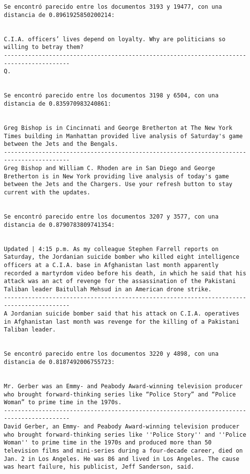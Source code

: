 \documentclass[11pt]{article}
\begin{document}
\begin{Verbatim}[commandchars=\\\{\}]
Se encontró parecido entre los documentos 3193 y 19477, con una distancia de 0.8961925850200214:


C.I.A. officers’ lives depend on loyalty. Why are politicians so willing to betray them?
-----------------------------------------------------------------------------------------
Q.


Se encontró parecido entre los documentos 3198 y 6504, con una distancia de 0.835970983240861:


Greg Bishop is in Cincinnati and George Bretherton at The New York Times building in Manhattan provided live analysis of Saturday's game between the Jets and the Bengals.
-----------------------------------------------------------------------------------------
Greg Bishop and William C. Rhoden are in San Diego and George Bretherton is in New York providing live analysis of today's game between the Jets and the Chargers. Use your refresh button to stay current with the updates.


Se encontró parecido entre los documentos 3207 y 3577, con una distancia de 0.8790783809741354:


Updated | 4:15 p.m. As my colleague Stephen Farrell reports on Saturday, the Jordanian suicide bomber who killed eight intelligence officers at a C.I.A. base in Afghanistan last month apparently recorded a martyrdom video before his death, in which he said that his attack was an act of revenge for the assassination of the Pakistani Taliban leader Baitullah Mehsud in an American drone strike.
-----------------------------------------------------------------------------------------
A Jordanian suicide bomber said that his attack on C.I.A. operatives in Afghanistan last month was revenge for the killing of a Pakistani Taliban leader.


Se encontró parecido entre los documentos 3220 y 4898, con una distancia de 0.8187492006755723:


Mr. Gerber was an Emmy- and Peabody Award-winning television producer who brought forward-thinking series like “Police Story” and “Police Woman” to prime time in the 1970s.
-----------------------------------------------------------------------------------------
David Gerber, an Emmy- and Peabody Award-winning television producer who brought forward-thinking series like ''Police Story'' and ''Police Woman'' to prime time in the 1970s and produced more than 50 television films and mini-series during a four-decade career, died on Jan. 2 in Los Angeles. He was 86 and lived in Los Angeles. The cause was heart failure, his publicist, Jeff Sanderson, said.



\end{Verbatim}
\end{document}
